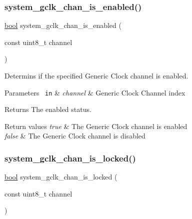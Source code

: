 \subsubsection{\texorpdfstring{system\_gclk\_chan\_is\_enabled()}{system\_gclk\_chan\_is\_enabled()}}
{\footnotesize\ttfamily \mbox{\hyperlink{group__group__sam0__utils_ga97a80ca1602ebf2303258971a2c938e2}{bool}} system\+\_\+gclk\+\_\+chan\+\_\+is\+\_\+enabled (\begin{DoxyParamCaption}\item[{const uint8\+\_\+t}]{channel }\end{DoxyParamCaption})}



Determins if the specified Generic Clock channel is enabled. 


\begin{DoxyParams}[1]{Parameters}
\mbox{\texttt{ in}}  & {\em channel} & Generic Clock Channel index\\
\hline
\end{DoxyParams}
\begin{DoxyReturn}{Returns}
The enabled status. 
\end{DoxyReturn}

\begin{DoxyRetVals}{Return values}
{\em true} & The Generic Clock channel is enabled \\
\hline
{\em false} & The Generic Clock channel is disabled \\
\hline
\end{DoxyRetVals}
\mbox{\label{group__asfdoc__sam0__system__clock__group_ga343a0b14dce2d7f2724382292ac1d8ef}} 
\subsubsection{\texorpdfstring{system\_gclk\_chan\_is\_locked()}{system\_gclk\_chan\_is\_locked()}}
{\footnotesize\ttfamily \mbox{\hyperlink{group__group__sam0__utils_ga97a80ca1602ebf2303258971a2c938e2}{bool}} system\+\_\+gclk\+\_\+chan\+\_\+is\+\_\+locked (\begin{DoxyParamCaption}\item[{const uint8\+\_\+t}]{channel }\end{DoxyParamCaption})}



